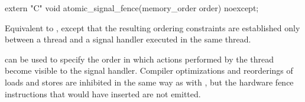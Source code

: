 %
\begin{itemdecl}
extern "C" void atomic_signal_fence(memory_order order) noexcept;
\end{itemdecl}

\begin{itemdescr}
\pnum
\effects Equivalent to , except that
the resulting ordering constraints are established only between a thread and a
signal handler executed in the same thread.

\pnum
\begin{note}
 can be used to specify the order in which actions
performed by the thread become visible to the signal handler.
Compiler optimizations and reorderings of loads and stores are inhibited in
the same way as with , but the hardware fence instructions
that  would have inserted are not emitted.
\end{note}
\end{itemdescr}
